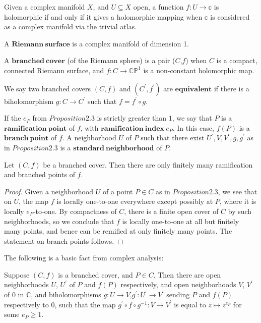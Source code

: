 \documentclass{article}
\begin{document}
\begin{definition}
Given a complex manifold $X$, and $U\subseteq X$ open, a function $f:U \to \mathbb{c}$ is holomorphic if and only if it gives a holomorphic mapping when $\mathbb{c}$ is considered as a complex manifold via the trivial atlas.
\end{definition}
\begin{definition}
A $\mathbf{Riemann \ surface}$ is a complex manifold of dimension 1.
\end{definition}
\begin{definition}
A $\mathbf{branched \ cover}$ (of the Riemann sphere) is a pair ($C$,$f$) when $C$ is a compact, connected Riemann surface, and $f:C\to \mathbb{CP}^{1} $ is a non-constant holomorphic map.
\end{definition}
\begin{definition}
We say two branched covers $(C,f)$ and $(C^{'},f^{'})$ are $\mathbf{equivalent}$ if there is a biholomorphism $g:C\to C^{'}$ such that $f=f^{'} \circ g$.
\end{definition}
\begin{definition}
If the $e_{P}$ from $Proposition 2.3$ is strictly greater than $1$, we say that $P$ is a $\mathbf{ramification \ point}$ of $f$, with $\mathbf{ramification \ index} \ e_{P}$. In this case, $f(P)$ is a $\mathbf{branch \ point}$
of $f$. A neighborhood $U$ of $P$ such that there exist $U^{'},V,V^{'},g,g^{'}$ as in $Proposition 2.3$ is a $\mathbf{standard \ neighborhood}$ of $P$.
\end{definition}
\begin{corollary}
Let $(C,f)$ be a branched cover. Then there are only finitely many ramification and branched points of $f$.
\end{corollary}
\begin{proof}
  Given a neighborhood $U$ of a point $P \in C$ as in $Proposition 2.3$, we see that on $U$, the map $f$ is locally one-to-one everywhere except possibly at $P$, where it is locally $e_{P}$-to-one. By compactness of $C$, there is a finite open cover of $C$ by such neighborhoods, so we conclude that $f$ is locally one-to-one at all but finitely many points, and bence can be remified at only finitely many points. The statement on branch points follows.
\end{proof}
The following is a basic fact from complex analysis:
\begin{proposition}
  Suppose $(C,f)$ is a branched cover, and $P \in C$. Then there are open neighborhoods $U$, $U^{'}$ of $P$ and $f(P)$ respectively, and open neighborhoods $V$, $V^{'}$ of $0$ in $\mathbb{C}$, and biholomorphisms $g:U \to V$,$g^{'}:U^{'} \to V^{'}$ sending $P$ and $f(P)$ respectively to $0$, such that the map $g^{'} \circ f \circ g^{-1}:V \to V^{'}$ is equal to $z \mapsto z^{e_{P}}$ for some $e_{P} \geqslant 1$.
\end{proposition}
\end{document}
